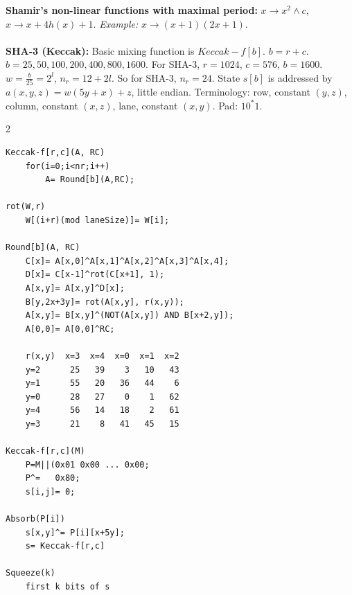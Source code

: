 {\bf Shamir's non-linear functions with maximal period:} $x \rightarrow x^2 \wedge c$,
$x \rightarrow x + 4 h(x) +1$. \emph{Example:} $x \rightarrow (x+1)(2x+1)$.
\\
\\
{\bf SHA-3 (Keccak):}
Basic mixing function is $Keccak-f[b]$.  $b= r+c$.
$b= 25, 50, 100, 200, 400, 800, 1600$.  For SHA-3, $r=1024$, $c=576$, $b=1600$.
$w= {\frac b {25}}= 2^l$, $n_r= 12+2l$.  So for SHA-3, $n_r= 24$. State $s[b]$
is addressed by $a(x,y,z)= w(5y+x)+z$, little endian. Terminology:
row, constant $(y, z)$, column, constant $(x, z)$, lane, constant $(x, y)$.
Pad: $10^*1$.
\begin {multicols} {2} {
\begin{verbatim}
Keccak-f[r,c](A, RC)
    for(i=0;i<nr;i++)
        A= Round[b](A,RC);

rot(W,r)
    W[(i+r)(mod laneSize)]= W[i];

Round[b](A, RC)
    C[x]= A[x,0]^A[x,1]^A[x,2]^A[x,3]^A[x,4];
    D[x]= C[x-1]^rot(C[x+1], 1);
    A[x,y]= A[x,y]^D[x];
    B[y,2x+3y]= rot(A[x,y], r(x,y));
    A[x,y]= B[x,y]^(NOT(A[x,y]) AND B[x+2,y]); 
    A[0,0]= A[0,0]^RC;

    r(x,y)  x=3  x=4  x=0  x=1  x=2
    y=2      25   39    3   10   43
    y=1      55   20   36   44    6
    y=0      28   27    0    1   62
    y=4      56   14   18    2   61
    y=3      21    8   41   45   15

Keccak-f[r,c](M)
    P=M||(0x01 0x00 ... 0x00;
    P^=   0x80;
    s[i,j]= 0;

Absorb(P[i])
    s[x,y]^= P[i][x+5y];
    s= Keccak-f[r,c]

Squeeze(k)
    first k bits of s
\end{verbatim}
}
\end{multicols}

